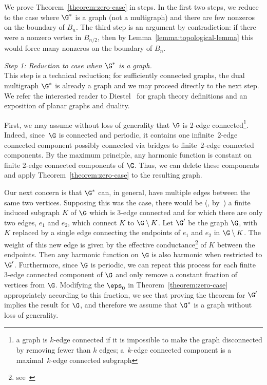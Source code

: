We prove Theorem~\ref{theorem:zero-case} in steps. In the first two steps, we reduce to the case where $\G^*$ is a graph (not a multigraph) and there are few nonzeros on the boundary of $B_n$. The third step is an argument by contradiction: if there were a nonzero vertex in $B_{n/2}$, then by Lemma~\ref{lemma:topological-lemma} this would force many nonzeros on the boundary of $B_{n}$.
\smallskip

{\it Step 1: Reduction to case when $\G^*$ is a graph.} \\
This step is a technical reduction; for sufficiently connected graphs, the dual multigraph $\G^*$ is already a graph and we may proceed directly to the next step. We refer the interested reader to Diestel~\cite[Section 4.6]{diestel2017graph} for graph theory definitions and an exposition of planar graphs and duality.


First, we may assume without loss of generality that $\G$ is 2-edge connected\footnote{a graph is $k$-edge connected if it is impossible to make the graph disconnected by removing fewer than $k$ edges; a~$k$-edge connected component is a maximal~$k$-edge connected subgraph}. Indeed, since~$\G$ is connected and periodic, it contains one infinite~$2$-edge connected component
possibly connected via bridges to finite~$2$-edge connected components.   
By the maximum principle, any harmonic function is constant on finite 2-edge connected components of $\G$. Thus, we can delete these components and apply Theorem~\ref{theorem:zero-case} to the resulting graph.

Our next concern is that $\G^*$ can, in general, have multiple edges between the same two vertices. Supposing this was the case, there would be (\eg, by~\cite[Proposition 4.6.2]{diestel2017graph}) a finite induced subgraph $K$ of $\G$ which is 3-edge connected
and for which there are only two edges, $e_1$ and $e_2$, which connect $K$ to $\G \setminus K$. Let $\G'$ be the graph $\G$, with $K$ replaced by a single edge connecting the endpoints of $e_1$ and $e_2$ in $\G \setminus K$. The weight of this new edge is given by the effective conductance\footnote{see~\cite[Section 3.4]{Doyle_Snell_1984}} of $K$ between the endpoints. Then any harmonic function on $\G$ is also harmonic when restricted to $\G'$. Furthermore, since $\G$ is periodic, we can repeat this process for each finite 3-edge connected component of $\G$ and only remove a constant fraction of vertices from $\G$. Modifying the $\eps_0$ in Theorem~\ref{theorem:zero-case} appropriately according to this fraction, we see that proving the theorem for $\G'$ implies the result for $\G$, and therefore we assume that $\G^*$ is a graph without loss of generality.
\smallskip

